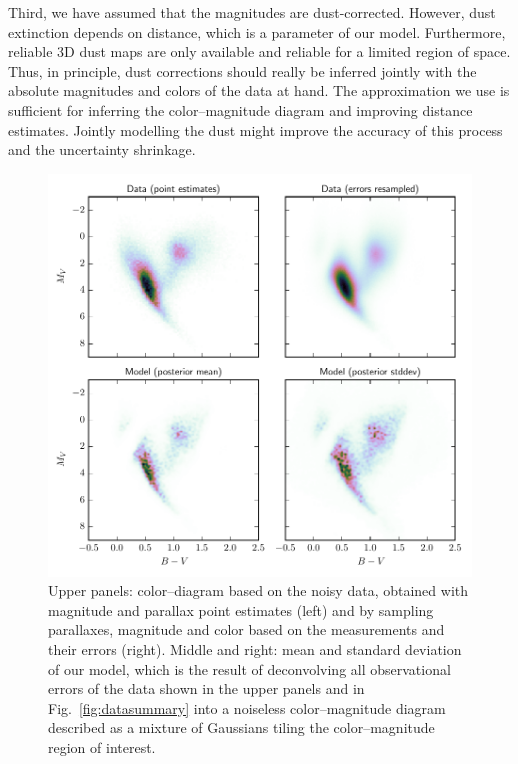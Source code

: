 \documentclass[manuscript, letterpaper]{aastex6}
\makeatletter
\let\origsection\section
\renewcommand\section{\@ifstar{\starsection}{\nostarsection}}
\newcommand\nostarsection[1]{\sectionprelude\origsection{#1}}
\newcommand\starsection[1]{\sectionprelude\origsection*{#1}}
\newcommand\sectionprelude{\vspace{1em}}
\newcommand{\figref}[1]{{\xspace}Fig.~\ref{#1}}
\makeatother
\begin{document}
Third, we have assumed that the magnitudes are dust-corrected. 
However, dust extinction depends on distance, which is a parameter of our model.
Furthermore, reliable 3D dust maps are only available and reliable for a limited region of space.
Thus, in principle, dust corrections should really be inferred jointly with the absolute magnitudes and colors of the data at hand. 
The approximation we use is sufficient for inferring the color--magnitude diagram and improving distance estimates.
Jointly modelling the dust might improve the accuracy of this process and the uncertainty shrinkage.


\section{Application to Gaia}

\begin{figure}
\hspace*{-3mm}\includegraphics[width=15cm]{colmagdiag_mainsample.pdf}
\caption{Upper panels: color--diagram based on the noisy data, obtained with magnitude and parallax point estimates (left) and by sampling parallaxes, magnitude and color based on the measurements and their errors (right). Middle and right: mean and standard deviation of our model, which is the result of deconvolving all observational errors of the data shown in the upper panels and in \figref{fig:datasummary} into a noiseless color--magnitude diagram described as a mixture of Gaussians tiling the color--magnitude region of interest. }
\label{fig:colmagdiag_mainsample}
\end{figure}
\end{document}
